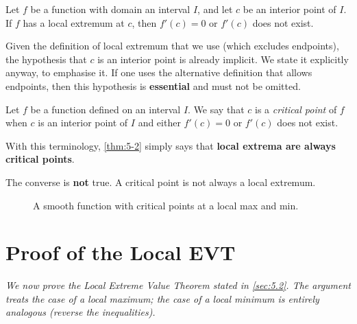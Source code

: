 \begin{theorem}
\label{thm:5-2}
Let $f$ be a function with domain an interval $I$, and let $c$ be an interior point of $I$.  If $f$ has a local extremum at $c$, then $f'(c) = 0$ or $f'(c)$ does not exist.
\end{theorem}

\begin{remark}
Given the definition of local extremum that we use (which excludes endpoints), the hypothesis that $c$ is an interior point is already implicit.  We state it explicitly anyway, to emphasise it.  If one uses the alternative definition that allows endpoints, then this hypothesis is \textbf{essential} and must not be omitted.
\end{remark}

\begin{definition}
\label{def:5-2}
Let $f$ be a function defined on an interval $I$.  We say that $c$ is a \emph{critical point} of $f$ when $c$ is an interior point of $I$ and either $f'(c) = 0$ or $f'(c)$ does not exist.
\end{definition}

With this terminology, \cref{thm:5-2} simply says that \textbf{local extrema are always critical points}.

\begin{remark}[Warning]
The converse is \textbf{not} true.  A critical point is not always a local extremum.
\end{remark}

\begin{figure}[ht]
  \centering
  
  \caption{A smooth function with critical points at a local max and min.}
  \label{fig:critical-points}
\end{figure}

\section{Proof of the Local EVT}
\label{sec:5.3}

\textit{We now prove the Local Extreme Value Theorem stated in \cref{sec:5.2}.  The argument treats the case of a local maximum; the case of a local minimum is entirely analogous (reverse the inequalities).}


